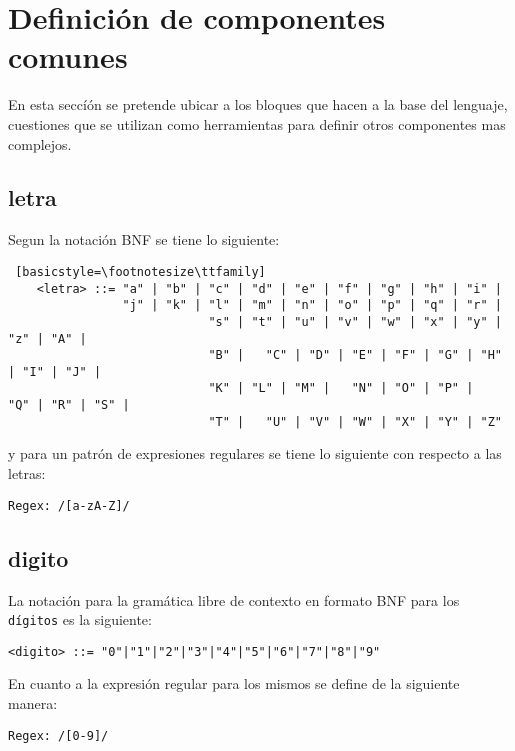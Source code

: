 \section{Definición de componentes comunes}
\label{sub:componentes_comunes}

En esta seccíón se pretende ubicar a los bloques que hacen a la base del
lenguaje, cuestiones que se utilizan como herramientas para definir otros
componentes mas complejos.

\subsection{letra}
\label{sub:letra}

Segun la notación BNF se tiene lo siguiente:

\begin{lstlisting} [basicstyle=\footnotesize\ttfamily]
	<letra> ::= "a" | "b" | "c" | "d" | "e" | "f" | "g" | "h" | "i" |
	            "j" | "k" |	"l" | "m" | "n" | "o" | "p" | "q" | "r" |
							"s" | "t" | "u" | "v" | "w" | "x" | "y" |	"z" | "A" |
							"B" |	"C" | "D" | "E" | "F" | "G" | "H" | "I" | "J" |
							"K" | "L" | "M" |	"N" | "O" | "P" |	"Q" | "R" | "S" |
							"T" |	"U" | "V" | "W" | "X" | "Y" | "Z"
\end{lstlisting}


y para un patrón de expresiones regulares se tiene lo
siguiente con respecto a las letras:

\begin{lstlisting}[basicstyle=\footnotesize\ttfamily]
Regex: /[a-zA-Z]/
\end{lstlisting}

\subsection{digito}
\label{sub:digito}
La notación para la gramática libre de contexto en formato BNF para los
\texttt{dígitos} es la siguiente:

\begin{lstlisting}[basicstyle=\footnotesize\ttfamily]
  <digito> ::= "0"|"1"|"2"|"3"|"4"|"5"|"6"|"7"|"8"|"9"
\end{lstlisting}

En cuanto a la expresión regular para los mismos se define de la siguiente
manera:

\begin{lstlisting}[basicstyle=\footnotesize\ttfamily]
	Regex: /[0-9]/
\end{lstlisting}

